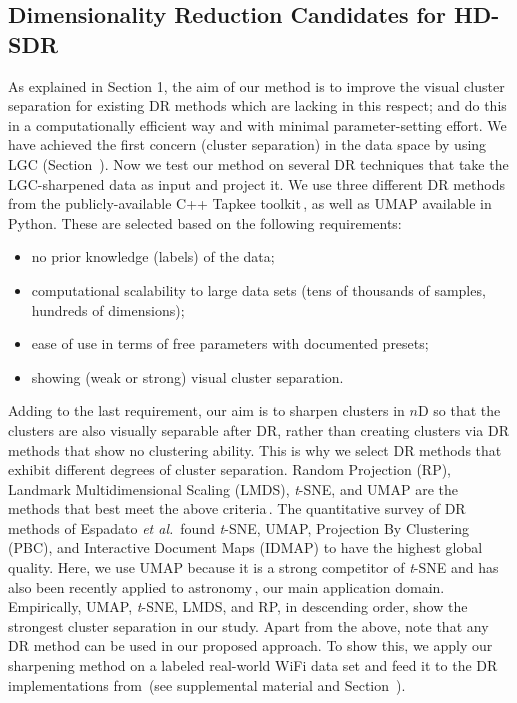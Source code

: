 \documentclass[sagev,Afour,times]{sagej}
\begin{document}
\subsection{Dimensionality Reduction Candidates for HD-SDR}
\label{sec:sub:dr}
\par As explained in Section 1, the aim of our method is to improve the visual cluster separation for existing DR methods which are lacking in this respect; and do this in a computationally efficient way and with minimal parameter-setting effort. We have achieved the first concern (cluster separation) in the data space by using LGC (Section~). Now we test our method on several DR techniques that take the LGC-sharpened data as input and project it. We use three different DR methods from the publicly-available C++ Tapkee toolkit\,\cite{tapkee:cite1}, as well as UMAP available in Python. These are selected based on the following requirements:
%
\begin{itemize}
    \item no prior knowledge (labels) of the data;
    \item computational scalability to large data sets (tens of thousands of samples, hundreds of dimensions);
    \item ease of use in terms of free parameters with documented presets;
    \item showing (weak or strong) visual cluster separation.
\end{itemize}

Adding to the last requirement, our aim is to sharpen clusters in $n$D so that the clusters are also visually separable after DR, rather than creating clusters via DR methods that show no clustering ability. This is why we select DR methods that exhibit different degrees of cluster separation. Random Projection (RP), Landmark Multidimensional Scaling (LMDS), \emph{t}-SNE, and UMAP are the methods that best meet the above criteria\,\cite{RP1:randomProj,lmds:original,tsne:original,umap2018}. The quantitative survey of DR methods of Espadato \emph{et al.}\,\cite{mateusDR_survey2019} found \emph{t}-SNE, UMAP, Projection By Clustering (PBC), and Interactive Document Maps (IDMAP) to have the highest global quality. Here, we use UMAP because it is a strong competitor of \emph{t}-SNE and has also been recently applied to astronomy\,\cite{umap:astro}, our main application domain. Empirically, UMAP, \emph{t}-SNE, LMDS, and RP, in descending order, show the strongest cluster separation in our study. Apart from the above, note that any DR method can be used in our proposed approach. To show this, we apply our sharpening method on a labeled real-world WiFi data set and feed it to the DR implementations from\,\cite{mateusDR_survey2019} (see supplemental material and Section~).
\end{document}
